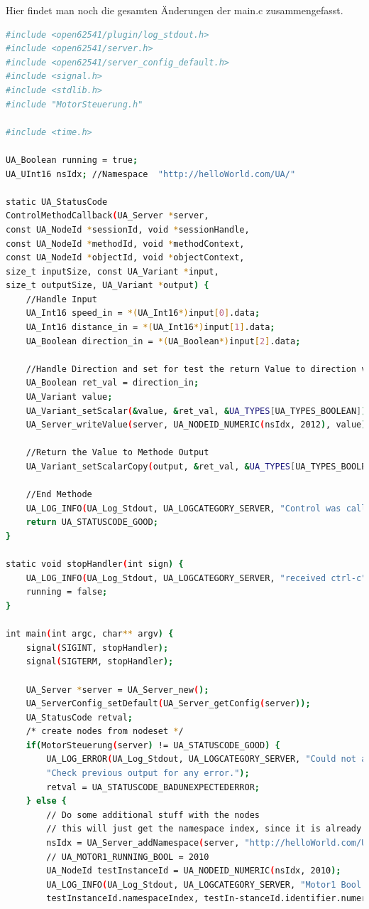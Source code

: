 Hier findet man noch die gesamten Änderungen der main.c zusammengefasst.
\begin{lstlisting}[language=Bash]
#include <open62541/plugin/log_stdout.h>
#include <open62541/server.h>
#include <open62541/server_config_default.h>
#include <signal.h>
#include <stdlib.h>
#include "MotorSteuerung.h"

#include <time.h>

UA_Boolean running = true;
UA_UInt16 nsIdx; //Namespace  "http://helloWorld.com/UA/"

static UA_StatusCode
ControlMethodCallback(UA_Server *server,
const UA_NodeId *sessionId, void *sessionHandle,
const UA_NodeId *methodId, void *methodContext,
const UA_NodeId *objectId, void *objectContext,
size_t inputSize, const UA_Variant *input,
size_t outputSize, UA_Variant *output) {
	//Handle Input
	UA_Int16 speed_in = *(UA_Int16*)input[0].data;
	UA_Int16 distance_in = *(UA_Int16*)input[1].data;
	UA_Boolean direction_in = *(UA_Boolean*)input[2].data;
	
	//Handle Direction and set for test the return Value to direction value
	UA_Boolean ret_val = direction_in;
	UA_Variant value;
	UA_Variant_setScalar(&value, &ret_val, &UA_TYPES[UA_TYPES_BOOLEAN]);
	UA_Server_writeValue(server, UA_NODEID_NUMERIC(nsIdx, 2012), value);
	
	//Return the Value to Methode Output
	UA_Variant_setScalarCopy(output, &ret_val, &UA_TYPES[UA_TYPES_BOOLEAN]);
	
	//End Methode
	UA_LOG_INFO(UA_Log_Stdout, UA_LOGCATEGORY_SERVER, "Control was called");
	return UA_STATUSCODE_GOOD;
}

static void stopHandler(int sign) {
	UA_LOG_INFO(UA_Log_Stdout, UA_LOGCATEGORY_SERVER, "received ctrl-c");
	running = false;
}

int main(int argc, char** argv) {
	signal(SIGINT, stopHandler);
	signal(SIGTERM, stopHandler);
	
	UA_Server *server = UA_Server_new();
	UA_ServerConfig_setDefault(UA_Server_getConfig(server));
	UA_StatusCode retval;
	/* create nodes from nodeset */
	if(MotorSteuerung(server) != UA_STATUSCODE_GOOD) {
		UA_LOG_ERROR(UA_Log_Stdout, UA_LOGCATEGORY_SERVER, "Could not add the Motor-Steuerung nodeset. "
		"Check previous output for any error.");
		retval = UA_STATUSCODE_BADUNEXPECTEDERROR;
	} else {
		// Do some additional stuff with the nodes
		// this will just get the namespace index, since it is already added to the server
		nsIdx = UA_Server_addNamespace(server, "http://helloWorld.com/UA/");
		// UA_MOTOR1_RUNNING_BOOL = 2010
		UA_NodeId testInstanceId = UA_NODEID_NUMERIC(nsIdx, 2010);
		UA_LOG_INFO(UA_Log_Stdout, UA_LOGCATEGORY_SERVER, "Motor1 Bool Running is in ns=%d;id=%d",
		testInstanceId.namespaceIndex, testIn-stanceId.identifier.numeric);
		

\end{lstlisting}
